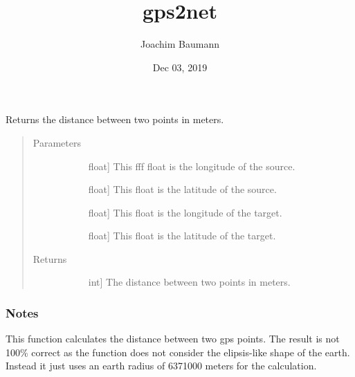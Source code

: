 \documentclass[letterpaper,10pt,english]{sphinxmanual}
\title{gps2net}
\date{Dec 03, 2019}
\author{Joachim Baumann}
\begin{document}
\pagestyle{empty}
\sphinxmaketitle
\pagestyle{plain}
\sphinxtableofcontents
\pagestyle{normal}
\label{\detokenize{index::doc}}


\begin{fulllineitems}
\label{\detokenize{index:gps2net.distFrom}}
Returns the distance between two points in meters.
\begin{quote}\begin{description}
\item[{Parameters}] \leavevmode\begin{description}
\item[{}] \leavevmode{[}float{]}
This fff float is the longitude of the source.

\item[{}] \leavevmode{[}float{]}
This float is the latitude of the source.

\item[{}] \leavevmode{[}float{]}
This float is the longitude of the target.

\item[{}] \leavevmode{[}float{]}
This float is the latitude of the target.

\end{description}

\item[{Returns}] \leavevmode\begin{description}
\item[{}] \leavevmode{[}int{]}
The distance between two points in meters.

\end{description}

\end{description}\end{quote}
\subsubsection*{Notes}

This function calculates the distance between two gps points.
The result is not 100\% correct as the function does not consider the elipsis-like shape of the earth. Instead it just uses an earth radius of 6371000 meters for the calculation.


\end{fulllineitems}
\end{document}
